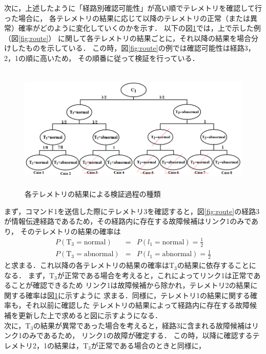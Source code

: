\documentclass[11pt]{jsreport}
\begin{document}
次に，上述したように「経路別確認可能性」が高い順でテレメトリを確認して行った場合に，
各テレメトリの結果に応じて以降のテレメトリの正常（または異常）確率がどのように変化していくのかを示す．
以下の図\ref{fig:TEL_result_process}では，上で示した例（図\ref{fig:route}）
に関して各テレメトリの結果ごとに，それ以降の結果を場合分けしたものを示している．
この時，図\ref{fig:route}の例では確認可能性は経路3，2，1の順に高いため，
その順番に従って検証を行っている．
\begin{figure}[H]
   \centering
      \includegraphics[height=6.0cm]{figure/TEL_result_process.png}
      \caption{各テレメトリの結果による検証過程の種類}
      \label{fig:TEL_result_process}
\end{figure}
まず，コマンド1を送信した際にテレメトリ3を確認すると，図\ref{fig:route}の経路3
が情報伝達経路であるため，その経路内に存在する故障候補はリンク1のみであり，
そのテレメトリの結果の確率は
\begin{eqnarray}
   P(\text{T}_3 = \text{normal})  &=& P(l_1 = \text{normal}) = \frac{1}{2} \label{eq:P_TEL3_normal} \\
   P(\text{T}_3 = \text{abnormal})  &=& P(l_1 = \text{abnormal}) = \frac{1}{2} \label{eq:P_TEL3_abnormal}
\end{eqnarray}
と求まる．これ以降の各テレメトリの結果の確率はT$_3$の結果に依存することになる．
まず，T$_3$が正常である場合を考えると，これによってリンク1は正常であることが確認できるため
リンク1は故障候補から除かれ，テレメトリ2の結果に関する確率は図\ref{fig:TEL_result_process}に示すように
求まる．同様に，テレメトリ1の結果に関する確率も，それ以前に確認した
テレメトリの結果によって経路内に存在する故障候補を更新した上で求めると図に示すようになる．\\
次に，T$_3$の結果が異常であった場合を考えると，経路3に含まれる故障候補はリンク1のみであるため，
リンク1の故障が確定する．
この時，以降に確認するテレメトリ2，1の結果は，T$_3$が正常である場合のときと同様に，
\end{document}
